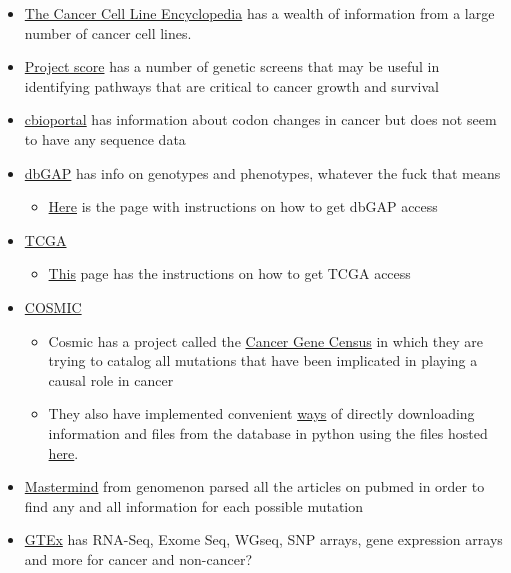 \documentclass[]{book}
\providecommand{\tightlist}{%
  \setlength{\itemsep}{0pt}\setlength{\parskip}{0pt}}
\begin{document}
\begin{itemize}
\tightlist
\item
  \href{https://www.nature.com/articles/s41586-019-1186-3?WT.ec_id=NATURE-201905\&sap-outbound-id=720FBE4668F2FE14A299D42CB43EF50D90063A16\&mkt-key=005056A5C6311ED999AC3A52796F7641}{The
  Cancer Cell Line Encyclopedia} has a wealth of information from a
  large number of cancer cell lines.
\item
  \href{https://score.depmap.sanger.ac.uk/}{Project score} has a number
  of genetic screens that may be useful in identifying pathways that are
  critical to cancer growth and survival
\item
  \href{http://www.cbioportal.org/}{cbioportal} has information about
  codon changes in cancer but does not seem to have any sequence data
\item
  \href{https://dbgap.ncbi.nlm.nih.gov/aa/wga.cgi?page=login}{dbGAP} has
  info on genotypes and phenotypes, whatever the fuck that means

  \begin{itemize}
  \tightlist
  \item
    \href{https://dbgap.ncbi.nlm.nih.gov/aa/wga.cgi?page=login}{Here} is
    the page with instructions on how to get dbGAP access
  \end{itemize}
\item
  \href{https://www.cancer.gov/about-nci/organization/ccg/research/structural-genomics/tcga}{TCGA}

  \begin{itemize}
  \tightlist
  \item
    \href{https://gdc.cancer.gov/access-data/obtaining-access-controlled-data}{This}
    page has the instructions on how to get TCGA access
  \end{itemize}
\item
  \href{https://cancer.sanger.ac.uk/cosmic}{COSMIC}

  \begin{itemize}
  \tightlist
  \item
    Cosmic has a project called the
    \href{https://cancer.sanger.ac.uk/cosmic/census?genome=37}{Cancer
    Gene Census} in which they are trying to catalog all mutations that
    have been implicated in playing a causal role in cancer
  \item
    They also have implemented convenient
    \href{https://cancer.sanger.ac.uk/cosmic/help/file_download}{ways}
    of directly downloading information and files from the database in
    python using the files hosted
    \href{https://cancer.sanger.ac.uk/cosmic/download}{here}.
  \end{itemize}
\item
  \href{https://mastermind.genomenon.com/api}{Mastermind} from genomenon
  parsed all the articles on pubmed in order to find any and all
  information for each possible mutation
\item
  \href{https://gtexportal.org/home/}{GTEx} has RNA-Seq, Exome Seq,
  WGseq, SNP arrays, gene expression arrays and more for cancer and
  non-cancer?
\end{itemize}
\end{document}
